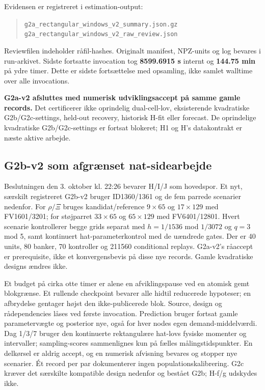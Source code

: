 Evidensen er registreret i estimation-output:
\begin{quote}\small
\texttt{g2a\_rectangular\_windows\_v2\_summary.json.gz}\\
\texttt{g2a\_rectangular\_windows\_v2\_raw\_review.json}
\end{quote}
Reviewfilen indeholder råfil-hashes. Originalt manifest, NPZ-units og log
bevares i run-arkivet.
Sidste fortsatte invocation tog \textbf{8599.6915 s} internt og
\textbf{144.75 min} på ydre timer. Dette er sidste fortsættelse med opsamling,
ikke samlet walltime over alle invocations.

\textbf{G2a-v2 afsluttes med numerisk udviklingsaccept på samme gamle records.}
Det certificerer ikke oprindelig dual-cell-lov, eksisterende kvadratiske
G2b/G2c-settings, held-out recovery, historisk H-fit eller forecast.
De oprindelige kvadratiske G2b/G2c-settings er fortsat blokeret;
H1 og H's datakontrakt er næste aktive arbejde.

\subsection{G2b-v2 som afgrænset nat-sidearbejde}
Beslutningen den 3. oktober kl. 22:26 bevarer H/I/J som hovedspor.
Et nyt, særskilt registreret G2b-v2 bruger ID1360/1361 og de fem parrede
scenarier nedenfor. For $\rho/\Xi$ bruges kandidat/reference $9\times65$ og
$17\times129$ med FV1601/3201; for støjparret $33\times65$ og $65\times129$
med FV6401/12801. Hvert scenarie kontrollerer begge grids separat med
$h=1/1536$ mod $1/3072$ og $q=3$ mod 5, samt kontinuert hat-parameterkontrol
med de uændrede gates. Der er 40 units, 80 banker, 70 kontroller og
211560 conditional replays. G2a-v2's råaccept er prerequisite, ikke et
konvergensbevis på disse nye records. Gamle kvadratiske designs ændres ikke.

Et budget på cirka otte timer er alene en afviklingspause ved en atomisk gemt
blokgrænse. Et rullende checkpoint bevarer alle hidtil reducerede hypoteser;
en afbrydelse gentager højst den ikke-publicerede blok. Source, design og
rådependencies låses ved første invocation. Prediction bruger fortsat gamle
parametervægte og posterior nye, også for hver nodes egen demand-middelværdi.
Dag 1/3/7 bruger den kontinuerte rektangulære hat-lovs fysiske momenter og
intervaller; sampling-scores sammenlignes kun på fælles målingstidspunkter.
En delkørsel er aldrig accept, og en numerisk afvisning bevares og stopper
nye scenarier. Ét record per par dokumenterer ingen populationskalibrering.
G2c kræver det særskilte kompatible design nedenfor og bestået G2b;
H-f/g udskydes ikke.


